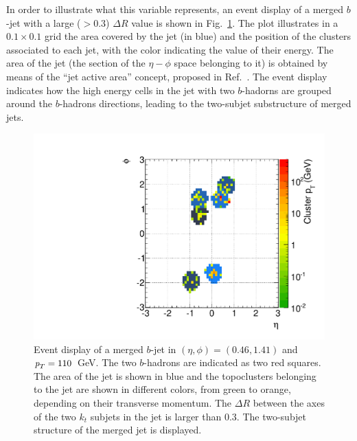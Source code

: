 In order to illustrate what this variable represents, an event display of a merged $b$-jet with a large  ($>0.3$) $\Delta R$  %
value is shown in Fig.~\ref{fig:ED}.  
The plot illustrates in a $0.1 \times 0.1$ grid the area covered by the jet (in blue) and the position of the clusters associated to each jet, with the color indicating the value of their energy. The area of the jet (the section of the $\eta - \phi$  space belonging to it) is obtained by means of the ``jet active area'' concept, proposed in Ref.~\cite{CatchmentArea}.
 The event display indicates how the high energy cells in the jet with two $b$-hadorns are grouped around the $b$-hadrons directions, leading to the two-subjet substructure of merged jets.

\begin{figure}[tp]
\centering
\includegraphics[width=1\textwidth]{FIGS/TEMPFigs/TESTEventDisplay2Cluster.pdf}
\caption{Event display of a merged $b$-jet in $(\eta,\phi)=(0.46,1.41)$ and ${\emph{p}_{T}} = 110$~GeV. The two $b$-hadrons are indicated as two red squares. The area of the jet is shown in blue and the topoclusters belonging to the jet are shown in different colors, from green to orange, depending on their transverse momentum. The $\Delta R$ between the axes of the two $k_t$ subjets in the jet is larger than 0.3. The two-subjet structure of the merged jet is displayed.}
\label{fig:ED}
\end{figure}


